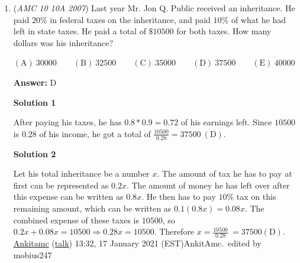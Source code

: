 \begin{enumerate}
            \begin{enumerate}
        \item $\frac{70 - 66}{66} = \frac{1}{16.5}$
            \end{enumerate}
            
            \begin{enumerate}
        \item $\frac{76-70}{70} \approx \frac{1}{11.7}$
            \end{enumerate}
            
            \begin{enumerate}
        \item $\frac{78-76}{76} = \frac{1}{38}$
            \end{enumerate}
            
            \begin{enumerate}
        \item $\frac{85-78}{78} \approx \frac{1}{11.1}$
            \end{enumerate}
            
The answer is $\mathrm{(A)}$.

 


	\item (\textit{AMC 10 10A 2007}) Last year Mr. Jon Q. Public received an inheritance. He paid $20\%$ in federal taxes on the inheritance, and paid $10\%$ of what he had left in state taxes. He paid a total of $\$10500$ for both taxes. How many dollars was his inheritance?


 $(\mathrm {A})\ 30000 \qquad (\mathrm {B})\ 32500 \qquad(\mathrm {C})\ 35000 \qquad(\mathrm {D})\ 37500 \qquad(\mathrm {E})\ 40000$

 \textbf{Answer: }D



\textbf{Solution 1}

After paying his taxes, he has $0.8*0.9=0.72$ of his earnings left. Since $10500$ is $0.28$ of his income, he got a total of $\frac{10500}{0.28}=37500\  \mathrm{(D)}$.

 



\textbf{Solution 2}

Let his total inheritance be a number $x$. The amount of tax he has to pay at first can be represented as $0.2x$. The amount of money he has left over after this expense can be written as $0.8x$. He then has to pay $10\%$ tax on this remaining amount, which can be written as $0.1(0.8x) = 0.08x$. The combined expense of these taxes is $10500$, so $0.2x + 0.08x = 10500 \Longrightarrow 0.28x = 10500$. Therefore $x = \frac{10500}{0.28}\ = 37500  \mathrm{(D)}$. \href{https://artofproblemsolving.com/wiki/index.php?title=User:Ankitamc&action=edit&redlink=1}{Ankitamc} (\href{https://artofproblemsolving.com/wiki/index.php?title=User\_talk:Ankitamc&action=edit&redlink=1}{talk}) 13:32, 17 January 2021 (EST)AnkitAmc.~edited by mobius247


\end{enumerate}
